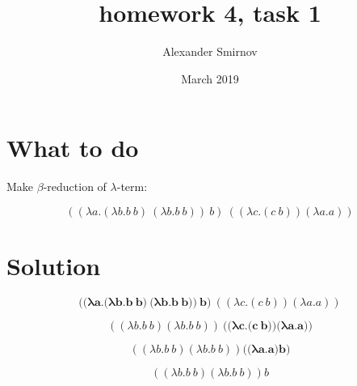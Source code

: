 \documentclass{article}
\title{homework 4, task 1}
\author{Alexander Smirnov}
\date{March 2019}
\begin{document}
\maketitle

\section{What to do}
Make $\beta$-reduction of $\lambda$-term:

$$((\lambda a.(\lambda b.b\:b)\:(\lambda b.b\:b))\:b)\:((\lambda c.(c\:b)) (\lambda a.a))$$

\section{Solution}

$$\textbf{(}\mathbf{\textbf{(} \lambda a.\textbf{(}\lambda b.b\:b\textbf{)}\:\textbf{(}\lambda b.b\:b\textbf{)}\textbf{)}\:b}\textbf{)}\:((\lambda c.(c\:b)) (\lambda a.a))$$

$$((\lambda b.b\:b)(\lambda b.b\:b))\mathbf{\:\textbf{(}\textbf{(}\lambda c.\textbf{(}c\:b\textbf{)}\textbf{)} \textbf{(}\lambda a.a\textbf{)}\textbf{)}}$$

$$((\lambda b.b\:b)(\lambda b.b\:b))\mathbf{\textbf{(}\textbf{(}\lambda a.a\textbf{)}b\textbf{)}}$$

$$((\lambda b.b\:b)(\lambda b.b\:b))b$$
\end{document}
